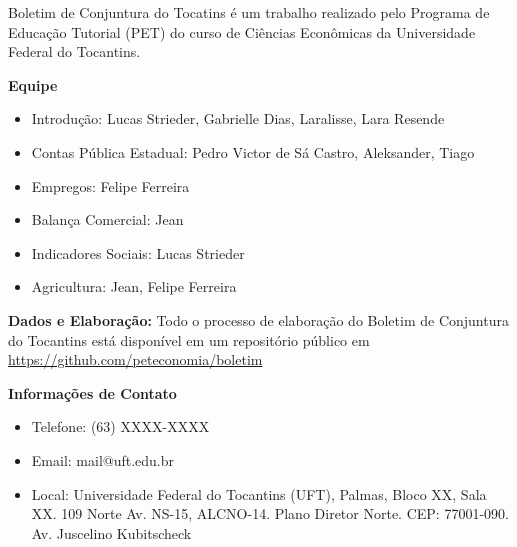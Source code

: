 \begin{tcolorbox}[colback=boxbackground, colframe=boxbackground, arc=0mm, top=15pt]
Boletim de Conjuntura do Tocatins é um trabalho realizado pelo Programa de Educação Tutorial (PET) do curso de Ciências Econômicas da Universidade Federal do Tocantins.
\\
\par{\bf Equipe}
\begin{itemize}
\item Introdução: Lucas Strieder, Gabrielle Dias, Laralisse, Lara Resende
\item Contas Pública Estadual: Pedro Victor de Sá Castro, Aleksander, Tiago
\item Empregos: Felipe Ferreira
\item Balança Comercial: Jean
\item Indicadores Sociais: Lucas Strieder
\item Agricultura: Jean, Felipe Ferreira
\end{itemize}
\par{\bf Dados e Elaboração:}
Todo o processo de elaboração do Boletim de Conjuntura do Tocantins está disponível em um repositório público em \url{https://github.com/peteconomia/boletim}
\\
\par{\bf Informações de Contato}
\begin{itemize}
	\item{Telefone:} (63) XXXX-XXXX
	\item{Email:} mail@uft.edu.br
	\item{Local:} Universidade Federal do Tocantins (UFT), Palmas, Bloco XX, Sala XX. 109 Norte Av. NS-15, ALCNO-14. Plano Diretor Norte. CEP: 77001-090. Av. Juscelino Kubitscheck
\end{itemize}

\end{tcolorbox}
